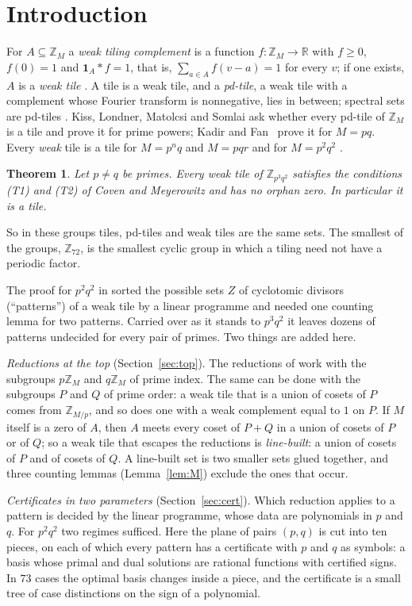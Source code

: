 \documentclass[11pt,a4paper]{amsart}
\newtheorem{theorem}{Theorem}
\theoremstyle{definition}
\theoremstyle{remark}
\newcommand{\Z}{\mathbb{Z}}
\newcommand{\R}{\mathbb{R}}
\newcommand{\one}{\mathbf{1}}
\begin{document}
\section{Introduction}

For $A\subseteq\Z_M$ a \emph{weak tiling complement} is a function $f:\Z_M\to\R$ with $f\ge0$, $f(0)=1$ and
$\one_A*f=1$, that is, $\sum_{a\in A}f(v-a)=1$ for every $v$; if one exists, $A$ is a \emph{weak tile}
\cite{LM,KLMS}. A tile is a weak tile, and a \emph{pd-tile}, a weak tile with a complement whose Fourier
transform is nonnegative, lies in between; spectral sets are pd-tiles \cite{KLMS}. Kiss, Londner, Matolcsi and
Somlai ask whether every pd-tile of $\Z_M$ is a tile and prove it for prime powers; Kadir and Fan~\cite{KF} prove
it for $M=pq$. Every \emph{weak} tile is a tile for $M=p^nq$ and $M=pqr$ \cite{NY} and for $M=p^2q^2$ \cite{N2}.

\begin{theorem}\label{thm:D}
Let $p\ne q$ be primes. Every weak tile of $\Z_{p^3q^2}$ satisfies the conditions \textup{(T1)} and \textup{(T2)}
of Coven and Meyerowitz and has no orphan zero. In particular it is a tile.
\end{theorem}

So in these groups tiles, pd-tiles and weak tiles are the same sets. The smallest of the groups, $\Z_{72}$, is the
smallest cyclic group in which a tiling need not have a periodic factor.

The proof for $p^2q^2$ in \cite{N2} sorted the possible sets $Z$ of cyclotomic divisors (``patterns'') of a weak
tile by a linear programme and needed one counting lemma for two patterns. Carried over as it stands to
$p^3q^2$ it leaves dozens of patterns undecided for every pair of primes. Two things are added here.

\emph{Reductions at the top} (Section~\ref{sec:top}). The reductions of \cite{N2} work with the subgroups
$p\Z_M$ and $q\Z_M$ of prime index. The same can be done with the subgroups $P$ and $Q$ of prime order: a weak
tile that is a union of cosets of $P$ comes from $\Z_{M/p}$, and so does one with a weak complement equal to $1$
on $P$. If $M$ itself is a zero of $A$, then $A$ meets every coset of $P+Q$ in a union of cosets of $P$ or of $Q$;
so a weak tile that escapes the reductions is \emph{line-built}: a union of cosets of $P$ and of cosets of $Q$.
A line-built set is two smaller sets glued together, and three counting lemmas (Lemma~\ref{lem:M}) exclude the
ones that occur.

\emph{Certificates in two parameters} (Section~\ref{sec:cert}). Which reduction applies to a pattern is decided
by the linear programme, whose data are polynomials in $p$ and $q$. For $p^2q^2$ two regimes sufficed. Here the
plane of pairs $(p,q)$ is cut into ten pieces, on each of which every pattern has a certificate with $p$ and $q$
as symbols: a basis whose primal and dual solutions are rational functions with certified signs. In $73$ cases
the optimal basis changes inside a piece, and the certificate is a small tree of case distinctions on the sign
of a polynomial.
\end{document}

